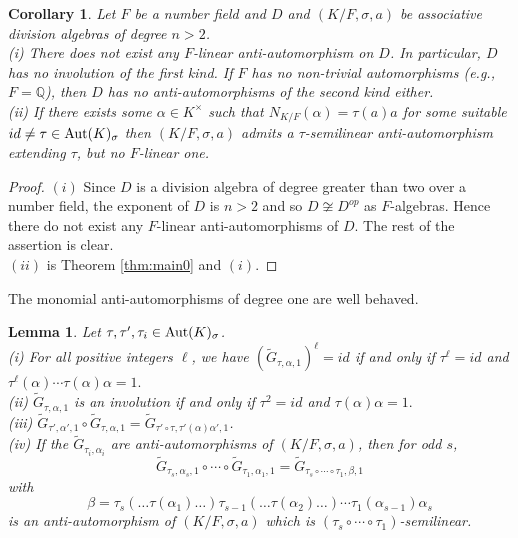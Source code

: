 \documentclass{amsart}
\theoremstyle{plain}
\newtheorem{lemma}[theorem]{Lemma}
\newtheorem{corollary}[theorem]{Corollary}
\theoremstyle{definition}
\numberwithin{equation}{section}
\numberwithin{figure}{section}
\begin{document}
\begin{corollary}
 Let $F$ be a number field  and $D$ and $(K/F,\sigma,a)$  be associative  division algebras of degree $n>2$.
  \\ (i) There does not exist any $F$-linear anti-automorphism on $D$. In particular, $D$ has no involution of the first kind.
   If $F$ has no non-trivial automorphisms (e.g., $F=\mathbb{Q}$), then $D$ has no anti-automorphisms of the second kind either.
  \\ (ii) If  there exists  some $\alpha\in K^\times$ such that $N_{K/F}( \alpha)= \tau(a)a$ for some suitable $id\not=\tau \in {\rm Aut}(K)_\sigma$ then $(K/F,\sigma,a)$ admits a $\tau$-semilinear anti-automorphism extending $\tau$, but no $F$-linear one.
  \end{corollary}

\begin{proof}
$(i)$ Since $D$ is a division algebra of degree greater than two over a number field, the exponent of $D$ is $n>2$ and so $D\not\cong D^{op}$ as $F$-algebras. Hence there do not exist any  $F$-linear anti-automorphisms of $D$. The rest of the assertion is clear.
\\ $(ii)$ is Theorem \ref{thm:main0} and $(i)$.
\end{proof}


The monomial anti-automorphisms of degree one are well behaved.


\begin{lemma}\label{le:1}
 Let $\tau, \tau',\tau_i \in {\rm Aut}(K)_\sigma$.
 \\
(i) For all positive integers $\ell$, we have $(\widetilde G_{\tau,\alpha,1})^\ell=id$  if and only if $\tau^\ell=id$ and
 $\tau^\ell(\alpha)\cdots \tau(\alpha)\alpha=1.$
 \\ (ii) $\widetilde G_{\tau,\alpha,1}$ is an involution if and only if $\tau^2=id$ and
 $ \tau(\alpha)\alpha=1.$
 \\ (iii)
 $\widetilde G_{\tau',\alpha',1}\circ \widetilde G_{\tau,\alpha,1}=\widetilde G_{\tau'\circ \tau,\tau'(\alpha)\alpha',1}$.
 \\ (iv) If the $\widetilde G_{\tau_i,\alpha_i}$  are  anti-automorphisms of $(K/F,\sigma,a)$, then for odd $s$,
 $$\widetilde G_{\tau_s,\alpha_s,1}\circ\cdots \circ  \widetilde G_{\tau_1,\alpha_1,1}=\widetilde G_{\tau_s\circ\cdots \circ \tau_1,\beta,1}$$
 with
 $$\beta=\tau_s(\dots \tau(\alpha_1)\dots ) \tau_{s-1}(\dots \tau(\alpha_2)\dots )\cdots \tau_1(\alpha_{s-1}) \alpha_s$$
 is an anti-automorphism of $(K/F,\sigma,a)$ which is $(\tau_s\circ\cdots \circ \tau_1)$-semilinear.
\end{lemma}
\end{document}
